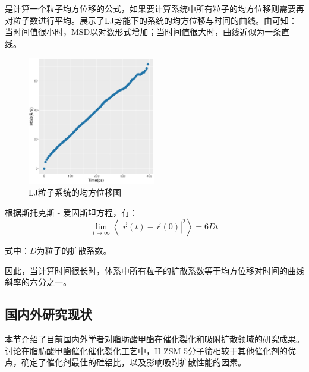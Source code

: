 \par{是计算一个粒子均方位移的公式，如果要计算系统中所有粒子的均方位移则需要再对粒子数进行平均。展示了LJ势能下的系统的均方位移与时间的曲线。由可知：当时间值很小时，MSD以对数形式增加；当时间值很大时，曲线近似为一条直线。}
\begin{figure}[H]
    \centering
    \includegraphics[width=0.5\textwidth]{figure/MSD.pdf}
    \caption{LJ粒子系统的均方位移图}
    \label{fig:MSD}
\end{figure}
\par{根据斯托克斯 - 爱因斯坦方程，有：}
\begin{equation}
    \lim _{t \rightarrow \infty}\left\langle|\vec{r}(t)-\vec{r}(0)|^{2}\right\rangle= 6 D t
\end{equation}
\par{式中：$D$为粒子的扩散系数。}
\par{因此，当计算时间很长时，体系中所有粒子的扩散系数等于均方位移对时间的曲线斜率的六分之一。}
\subsection{国内外研究现状}
\par{本节介绍了目前国内外学者对脂肪酸甲酯在催化裂化和吸附扩散领域的研究成果。讨论在脂肪酸甲酯催化催化裂化工艺中，H-ZSM-5分子筛相较于其他催化剂的优点，确定了催化剂最佳的硅铝比，以及影响吸附扩散性能的因素。}
